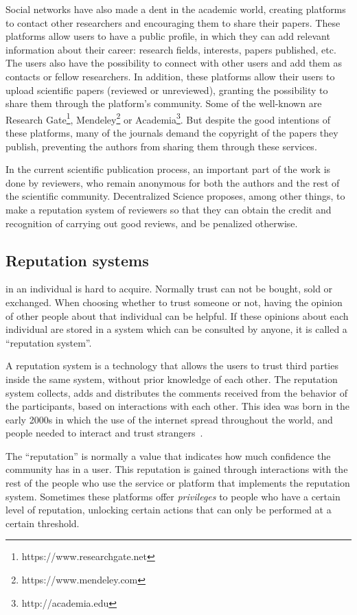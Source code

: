Social networks have also made a dent in the academic world, creating platforms
to contact other researchers and encouraging them to share their papers. These
platforms allow users to have a public profile, in which they can add relevant
information about their career: research fields, interests, papers published,
etc. The users also have the possibility to connect with other users and add
them as contacts or fellow researchers. In addition, these platforms allow their
users to upload scientific papers (reviewed or unreviewed), granting the
possibility to share them through the platform's community. Some of the
well-known are Research Gate\footnote{https://www.researchgate.net},
Mendeley\footnote{https://www.mendeley.com} or
Academia\footnote{http://academia.edu}. But despite the good intentions of these
platforms, many of the journals demand the copyright of the papers they publish,
preventing the authors from sharing them through these services.

In the current scientific publication process, an important part of the work is
done by reviewers, who remain anonymous for both the authors and the rest of the
scientific community. Decentralized Science proposes, among other things, to
make a reputation system of reviewers so that they can obtain the credit and
recognition of carrying out good reviews, and be penalized otherwise.

\subsection{Reputation systems}
\label{scb:rs}

 in an individual is hard to acquire. Normally trust can not be
bought, sold or exchanged. When choosing whether to trust someone or not, having
the opinion of other people about that individual can be helpful. If these
opinions about each individual are stored in a system which can be consulted by
anyone, it is called a ``reputation system''.

A reputation system is a technology that allows the users to trust third parties
inside the same system, without prior knowledge of each other. The reputation
system collects, adds and distributes the comments received from the behavior of
the participants, based on interactions with each other. This idea was born in
the early 2000s in which the use of the internet spread throughout the world,
and people needed to interact and trust strangers~\cite{resnick2000reputation}.

The ``reputation'' is normally a value that indicates how much confidence the
community has in a user. This reputation is gained through interactions with the
rest of the people who use the service or platform that implements the
reputation system. Sometimes these platforms offer \emph{privileges} to people
who have a certain level of reputation, unlocking certain actions that can only
be performed at a certain threshold.

